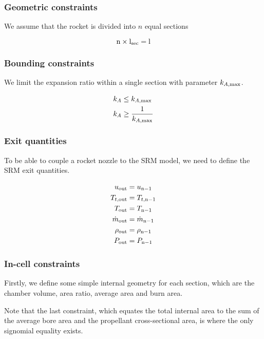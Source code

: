 \subsubsection{Geometric constraints}

We assume that the rocket is divided into $n$ equal sections

\begin{equation}
    \rm{n} \times l_{\rm{sec}} = l
\end{equation}

\subsubsection{Bounding constraints}

We limit the expansion ratio within a single section with parameter $k_{A, \rm{max}}$.

\begin{align}
    k_A &\leq k_{A,\rm{max}} \\
    k_A &\geq \frac{1}{k_{A,\rm{max}}}
\end{align}

\subsubsection{Exit quantities}

To be able to couple a rocket nozzle to the SRM model,
we need to define the SRM exit quantities.

\begin{align}
    u_{\rm{out}} &= u_{\rm{n}-1} \\
    T_{t,\rm{out}} &= T_{t,\rm{n}-1} \\
    T_{\rm{out}} &= T_{\rm{n}-1} \\
    \dot{m}_{\rm{out}} &= \dot{m}_{\rm{n}-1} \\
    \rho_{\rm{out}} &= \rho_{\rm{n}-1} \\
    P_{\rm{out}} &= P_{\rm{n}-1}
\end{align}

\subsubsection{In-cell constraints}

Firstly, we define some simple internal geometry for each section, which are the
chamber volume, area ratio, average area and burn area.

Note that the last constraint, which equates the total internal area to the
sum of the average bore area and the propellant cross-sectional area,
is where the only signomial equality exists.

